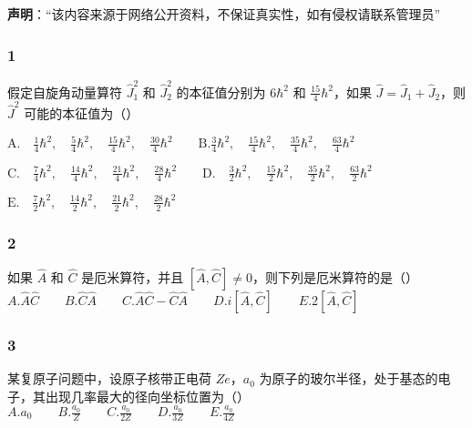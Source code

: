 
\textbf{声明}：“该内容来源于网络公开资料，不保证真实性，如有侵权请联系管理员”

\subsubsection{1}
假定自旋角动量算符 $\hat{J}_1^2$ 和 $\hat{J}_2^2$ 的本征值分别为 $6\hbar^2$ 和 $\frac{15}{4}\hbar^2$，如果 $\hat{J} = \hat{J}_1 + \hat{J}_2$，则 $\hat{J}^2$ 可能的本征值为（）

$\text{A.} \quad \frac{1}{4}\hbar^2, \quad \frac{5}{4}\hbar^2, \quad \frac{15}{4}\hbar^2, \quad \frac{30}{4}\hbar^2\qquad \text{B.}\frac{3}{4}\hbar^2, \quad \frac{15}{4}\hbar^2, \quad \frac{35}{4}\hbar^2, \quad \frac{63}{4}\hbar^2$

$\text{C.} \quad \frac{7}{4}\hbar^2, \quad \frac{14}{4}\hbar^2, \quad \frac{21}{4}\hbar^2, \quad \frac{28}{4}\hbar^2\qquad\text{D.} \quad \frac{3}{2}\hbar^2, \quad \frac{15}{2}\hbar^2, \quad \frac{35}{2}\hbar^2, \quad \frac{63}{2}\hbar^2$

$\text{E.} \quad \frac{7}{2}\hbar^2, \quad \frac{14}{2}\hbar^2, \quad \frac{21}{2}\hbar^2, \quad \frac{28}{2}\hbar^2$
\subsubsection{2}
如果 $\hat{A}$ 和 $\hat{C}$ 是厄米算符，并且 $[\hat{A}, \hat{C}] \neq 0$，则下列是厄米算符的是（）\\
$A. \hat{A}\hat{C}\qquad B. \hat{C}\hat{A}\qquad C. \hat{A}\hat{C} - \hat{C}\hat{A}\qquad D. i[\hat{A}, \hat{C}]\qquad E. 2[\hat{A}, \hat{C}]$
\subsubsection{3}
某复原子问题中，设原子核带正电荷 $Ze$，$a_0$ 为原子的玻尔半径，处于基态的电子，其出现几率最大的径向坐标位置为（）\\
$A. a_0\qquad B. \frac{a_0}{Z}\qquad C. \frac{a_0}{2Z}\qquad D. \frac{a_0}{3Z}\qquad E. \frac{a_0}{4Z}$
